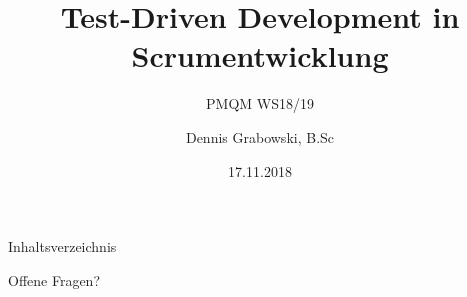 \documentclass{f4_beamer}
\title{Test-Driven Development in Scrumentwicklung}
\subtitle{PMQM WS18/19}
\author{Dennis Grabowski, B.Sc}
\date{17.11.2018}
\begin{document}
\begin{frame}{Inhaltsverzeichnis}
    \tableofcontents[hideallsubsections]
  \end{frame}

\begin{frame}[standout]
  Offene Fragen?
\end{frame}
\end{document}
